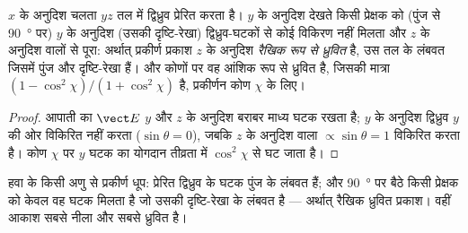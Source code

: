 \begin{proposition}[प्रकीर्णन से ध्रुवण]\label{prop:b2:dipole-radiation:polarization}
$x$ के अनुदिश चलता  $yz$ तल में द्विध्रुव प्रेरित करता है।
$y$ के अनुदिश देखते किसी प्रेक्षक को (पुंज से \qty{90}{\degree} पर)
$y$ के अनुदिश (उसकी दृष्टि-रेखा) द्विध्रुव-घटकों से कोई विकिरण नहीं मिलता
और $z$ के अनुदिश वालों से पूरा: अर्थात् प्रकीर्ण प्रकाश $z$ के अनुदिश
\emph{रैखिक रूप से ध्रुवित} है, उस तल के लंबवत जिसमें
पुंज और दृष्टि-रेखा हैं। और कोणों पर वह
आंशिक रूप से ध्रुवित है, जिसकी मात्रा $(1 - \cos^2\chi)/(1 + \cos^2\chi)$ है,
प्रकीर्णन कोण $\chi$ के लिए।
\end{proposition}

\begin{proof}
आपाती  का $\vect E$ $y$ और $z$ के अनुदिश बराबर माध्य घटक
रखता है; $y$ के अनुदिश द्विध्रुव $y$ की ओर विकिरित नहीं करता ($\sin
\theta = 0$), जबकि $z$ के अनुदिश वाला $\propto\sin\theta = 1$ विकिरित करता है। कोण $\chi$ पर
$y$ घटक का योगदान तीव्रता में $\cos^2\chi$ से घट जाता है।
\end{proof}

\begin{omfigure}

{\small हवा के किसी अणु से प्रकीर्ण धूप: प्रेरित द्विध्रुव के घटक
पुंज के लंबवत हैं; और \qty{90}{\degree} पर बैठे किसी प्रेक्षक को
केवल वह घटक मिलता है जो उसकी दृष्टि-रेखा के लंबवत है ---
अर्थात् रैखिक ध्रुवित प्रकाश। वहीं आकाश सबसे नीला और सबसे ध्रुवित है।}
\end{omfigure}

